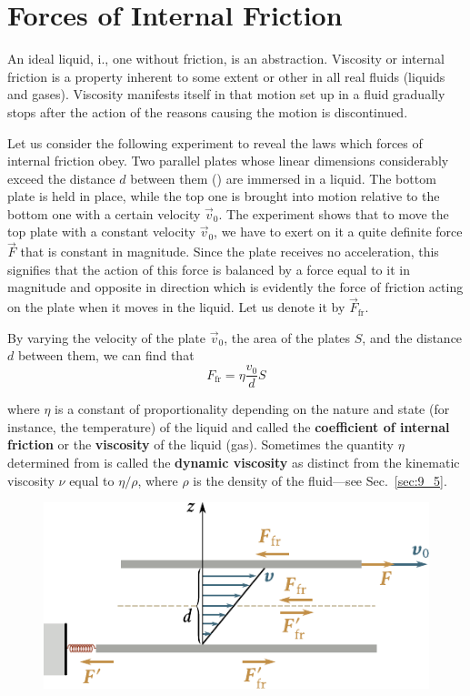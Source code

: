 \section{Forces of Internal Friction}\label{sec:9_4}

An ideal liquid, i.\ie, one without friction, is an abstraction. Viscosity or internal friction is a property inherent to some extent or other in all real fluids (liquids and gases). Viscosity manifests itself in that motion set up in a fluid gradually stops after the action of the reasons causing the motion is discontinued.

Let us consider the following experiment to reveal the laws which forces of internal friction obey. Two parallel plates whose linear dimensions considerably exceed the distance $d$ between them () are immersed in a liquid. The bottom plate is held in place, while the top one is brought into motion relative to the bottom one with a certain velocity $\vec{v}_0$. The experiment shows that to move the top plate with a constant velocity $\vec{v}_0$, we have to exert on it a quite definite force $\vec{F}$ that is constant in magnitude. Since the plate receives no acceleration, this signifies that the action of this force is balanced by a force equal to it in magnitude and opposite in direction which is evidently the force of friction acting on the plate when it moves in the liquid. Let us denote it by $\vec{F}_{\text{fr}}$.

By varying the velocity of the plate $\vec{v}_0$, the area of the plates $S$, and the distance $d$ between them, we can find that
\begin{equation}\label{eq:9_9}
	F_{\text{fr}} = \eta\frac{v_0}{d}S
\end{equation}

\noindent
where $\eta$ is a constant of proportionality depending on the nature and state (for instance, the temperature) of the liquid and called the \textbf{coefficient of internal friction} or the \textbf{viscosity} of the liquid (gas). Sometimes the quantity $\eta$ determined from  is called the \textbf{dynamic viscosity} as distinct from the kinematic viscosity $\nu$ equal to $\eta/\rho$, where $\rho$ is the density of the fluid---see Sec.~\ref{sec:9_5}.

\begin{figure}[t]
	\begin{center}
		\includegraphics[scale=1.0]{figures/ch_09/fig_9_9.pdf}
		\caption[]{}
		\label{fig:9_9}
	\end{center}
	\vspace{-0.8cm}
\end{figure}

